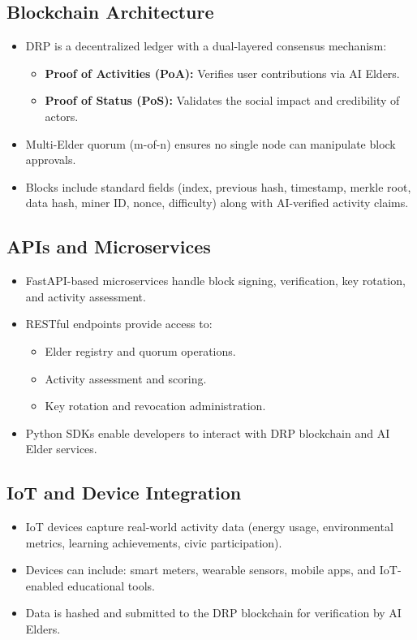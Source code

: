\documentclass[11pt,a4paper]{article}
\begin{document}
\subsection{Blockchain Architecture}
\begin{itemize}
    \item DRP is a decentralized ledger with a dual-layered consensus mechanism:  
        \begin{itemize}
            \item \textbf{Proof of Activities (PoA):} Verifies user contributions via AI Elders.  
            \item \textbf{Proof of Status (PoS):} Validates the social impact and credibility of actors.  
        \end{itemize}
    \item Multi-Elder quorum (m-of-n) ensures no single node can manipulate block approvals.  
    \item Blocks include standard fields (index, previous hash, timestamp, merkle root, data hash, miner ID, nonce, difficulty) along with AI-verified activity claims.  
\end{itemize}



\subsection{APIs and Microservices}
\begin{itemize}
    \item FastAPI-based microservices handle block signing, verification, key rotation, and activity assessment.  
    \item RESTful endpoints provide access to:  
        \begin{itemize}
            \item Elder registry and quorum operations.  
            \item Activity assessment and scoring.  
            \item Key rotation and revocation administration.  
        \end{itemize}
    \item Python SDKs enable developers to interact with DRP blockchain and AI Elder services.  
\end{itemize}

\subsection{IoT and Device Integration}
\begin{itemize}
    \item IoT devices capture real-world activity data (energy usage, environmental metrics, learning achievements, civic participation).  
    \item Devices can include: smart meters, wearable sensors, mobile apps, and IoT-enabled educational tools.  
    \item Data is hashed and submitted to the DRP blockchain for verification by AI Elders.  
\end{itemize}
\end{document}

